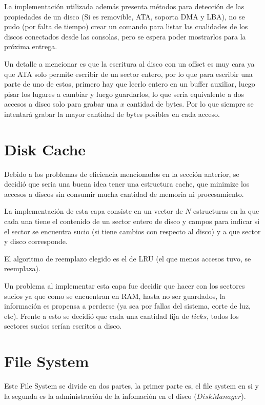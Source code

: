 \documentclass[english]{article}
\begin{document}
La implementación utilizada además presenta métodos para detección
de las propiedades de un disco (Si es removible, ATA, soporta DMA
y LBA), no se pudo (por falta de tiempo) crear un comando para listar
las cualidades de los discos conectados desde las consolas, pero se
espera poder mostrarlos para la próxima entrega.

Un detalle a mencionar es que la escritura al disco con un offset
es muy cara ya que ATA solo permite escribir de un sector entero,
por lo que para escribir una parte de uno de estos, primero hay que
leerlo entero en un buffer auxiliar, luego pisar los lugares a cambiar
y luego guardarlos, lo que seria equivalente a dos accesos a disco
solo para grabar una $x$ cantidad de bytes. Por lo que siempre se
intentará grabar la mayor cantidad de bytes posibles en cada acceso.

\pagebreak{}


\section{Disk Cache}

Debido a los problemas de eficiencia mencionados en la sección anterior,
se decidió que seria una buena idea tener una estructura cache, que
minimize los accesos a discos sin consumir mucha cantidad de memoria
ni procesamiento. 

La implementación de esta capa consiste en un vector de $N$ estructuras 
en la que cada una tiene el contenido de un sector entero de disco y campos 
para indicar si el sector se encuentra sucio (si tiene cambios con respecto 
al disco) y a que sector y disco corresponde.

El algoritmo de reemplazo elegido es el de LRU (el que menos accesos
tuvo, se reemplaza). 

Un problema al implementar esta capa fue decidir que hacer con los sectores
sucios ya que como se encuentran en RAM, hasta no ser guardados, la
información es propensa a perderse (ya sea por fallas del sistema,
corte de luz, etc). Frente a esto se decidió que cada una cantidad
fija de $ticks$, todos los sectores sucios serían escritos a disco. 

\pagebreak{}


\section{File System}

Este File System se divide en dos partes, la primer parte es, el
file system en si y la segunda es la administración de la infomación
en el disco ($DiskManager$).
\end{document}
